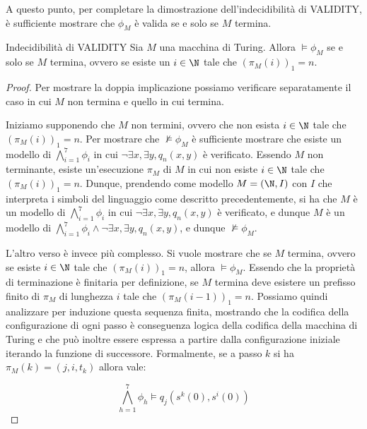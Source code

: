 A questo punto, per completare la dimostrazione dell'indecidibilità di VALIDITY, è sufficiente mostrare che \(\phi_M\) è valida se e solo se \(M\) termina.

\begin{theorem}{Indecidibilità di VALIDITY}
  Sia \(M\) una macchina di Turing. Allora \(\models \phi_M\) se e solo se \(M\) termina, ovvero se esiste un \(i \in \N\) tale che \({(\pi_M(i))}_1 = n\).
\end{theorem}
\begin{proof}
  
  Per mostrare la doppia implicazione possiamo verificare separatamente il caso in cui \(M\) non termina e quello in cui termina.
  
  Iniziamo supponendo che \(M\) non termini, ovvero che non esista \(i \in \N\) tale che \({(\pi_M(i))}_1 = n\).
  Per mostrare che \(\not\models \phi_M\) è sufficiente mostrare che esiste un modello di \(\bigwedge_{i=1}^{7} \phi_i\) in cui \(\neg\exists x, \exists y, q_n(x,y)\) è verificato. Essendo \(M\) non terminante, esiste un'esecuzione \(\pi_M\) di \(M\) in cui non esiste \(i \in \N\) tale che \({(\pi_M(i))}_1 = n\). Dunque, prendendo come modello \(M = (\N,I)\) con \(I\) che interpreta i simboli del linguaggio come descritto precedentemente, si ha che \(M\) è un modello di \(\bigwedge_{i=1}^{7} \phi_i\) in cui \(\neg\exists x, \exists y, q_n(x,y)\) è verificato, e dunque \(M\) è un modello di \(\bigwedge_{i=1}^{7} \phi_i \land \neg\exists x, \exists y, q_n(x,y)\), e dunque \(\not\models \phi_M\).
  
  L'altro verso è invece più complesso. Si vuole mostrare che se \(M\) termina, ovvero se esiste \(i \in \N\) tale che \({(\pi_M(i))}_1 = n\), allora \(\models \phi_M\). Essendo che la proprietà di terminazione è finitaria per definizione, se \(M\) termina deve esistere un prefisso finito di \(\pi_M\) di lunghezza \(i\) tale che \({(\pi_M(i-1))}_1 = n\). Possiamo quindi analizzare per induzione questa sequenza finita, mostrando che la codifica della configurazione di ogni passo è conseguenza logica della codifica della macchina di Turing e che può inoltre essere espressa a partire dalla configurazione iniziale iterando la funzione di successore. Formalmente, se a passo \(k\) si ha \(\pi_M(k) = (j, i, t_k)\) allora vale:
  
  \begin{equation}
    \bigwedge_{h=1}^{7} \phi_h \models q_j(s^k(0), s^i(0)) 
  \end{equation}
  

\end{proof}
